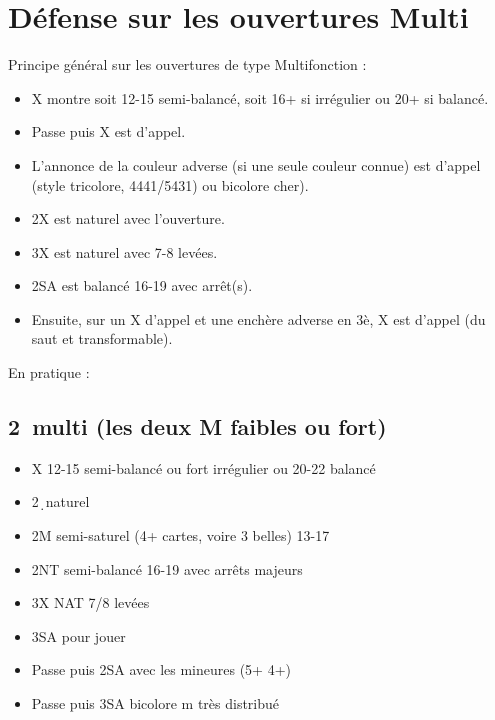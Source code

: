 \documentclass[a4paper]{article}
\begin{document}
\section{Défense sur les ouvertures Multi}

Principe général sur les ouvertures de type Multifonction :

\begin{itemize}
\item X montre soit 12-15 semi-balancé, soit 16+ si irrégulier ou 20+ si balancé.

\item Passe puis X est d'appel.

\item L'annonce de la couleur adverse (si une seule couleur connue) est d'appel (style tricolore, 4441/5431) ou bicolore cher).

\item 2X est naturel avec l'ouverture.

\item 3X est naturel avec 7-8 levées.

\item 2SA est balancé 16-19 avec arrêt(s).

\item Ensuite, sur un X d'appel et une enchère adverse en 3è, X est d'appel (du saut et transformable).

\end{itemize}

En pratique :

\subsection{2\pdfc\ multi (les deux M faibles ou fort)}

\begin{itemize}
\item X 12-15 semi-balancé ou fort irrégulier ou 20-22 balancé

\item 2\d\ naturel

\item 2M semi-saturel (4+ cartes, voire 3 belles) 13-17

\item 2NT semi-balancé 16-19 avec arrêts majeurs

\item 3X NAT 7/8 levées

\item 3SA pour jouer

\item Passe puis 2SA avec les mineures (5+ 4+)

\item Passe puis 3SA bicolore m très distribué

\end{itemize}
\end{document}
